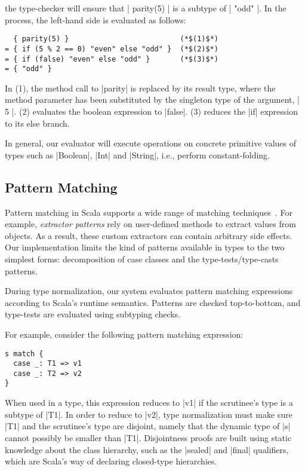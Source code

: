 \noindent
the type-checker will ensure that |{ parity(5) }| is a subtype of |{ "odd" }|.
In the process, the left-hand side is evaluated as follows:

\begin{lstlisting}
  { parity(5) }                          (*$(1)$*)
= { if (5 % 2 == 0) "even" else "odd" }  (*$(2)$*)
= { if (false) "even" else "odd" }       (*$(3)$*)
= { "odd" }
\end{lstlisting}

\noindent
In (1), the method call to |parity| is replaced by its result type, where the method parameter has been substituted by the singleton type of the argument, |{ 5 }|.
(2) evaluates the boolean expression to |false|.
(3) reduces the |if| expression to its else branch.

In general, our evaluator will execute operations on concrete primitive values of types such as |Boolean|, |Int| and |String|, i.e., perform constant-folding.

\subsection{Pattern Matching}
\label{pattern-matching}

Pattern matching in Scala supports a wide range of matching techniques~\citep{emir2007matching}.
For example, \emph{extractor patterns} rely on user-defined methods to extract values from objects.
As a result, these custom extractors can contain arbitrary side effects.
Our implementation limits the kind of patterns available in types to the two simplest forms: decomposition of case classes and the type-tests/type-casts patterns.

During type normalization, our system evaluates pattern matching expressions according to Scala's runtime semantics.
Patterns are checked top-to-bottom, and type-tests are evaluated using subtyping checks.

For example, consider the following pattern matching expression:

\begin{lstlisting}
s match {
  case _: T1 => v1
  case _: T2 => v2
}
\end{lstlisting}

\noindent
When used in a type, this expression reduces to |v1| if the scrutinee's type is a subtype of |T1|.
In order to reduce to |v2|, type normalization must make sure |T1| and the scrutinee's type are disjoint, namely that the dynamic type of |s| cannot possibly be smaller than |T1|.
Disjointness proofs are built using static knowledge about the class hierarchy, such as the |sealed| and |final| qualifiers, which are Scala's way of declaring closed-type hierarchies.

